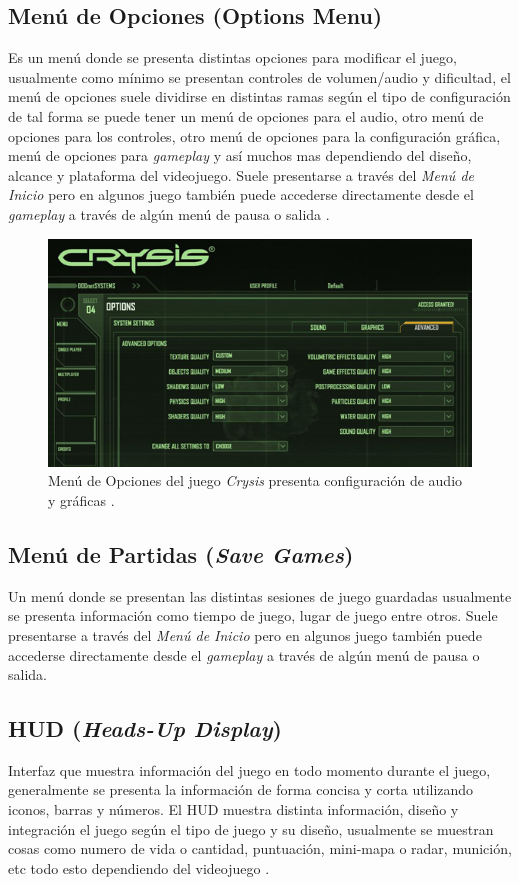 \subsection{Menú de Opciones (Options Menu)}
Es un menú donde se presenta distintas opciones para modificar el juego, usualmente como mínimo se presentan controles de volumen/audio y dificultad, el menú de opciones suele dividirse en distintas ramas según el tipo de configuración de tal forma se puede tener un menú de opciones para el audio, otro menú de opciones para los controles, otro menú de opciones para la configuración gráfica, menú de opciones para \emph{gameplay} y así muchos mas dependiendo del diseño, alcance y plataforma del videojuego. Suele presentarse a través del \emph{Menú de Inicio} pero en algunos juego también puede accederse directamente desde el \emph{gameplay} a través de algún menú de pausa o salida \cite{gb_optionsmenu}.~\\

\begin{figure}[H]
\centering
\includegraphics[width=0.95\linewidth]{media/crysis_opmenu.jpg} 
\caption{Menú de Opciones del juego \emph{Crysis} presenta configuración de audio y gráficas \cite{crysis}.}
\end{figure}

\subsection{Menú de Partidas (\emph{Save Games})}
Un menú donde se presentan las distintas sesiones de juego guardadas usualmente se presenta información como tiempo de juego, lugar de juego entre otros. Suele presentarse a través del \emph{Menú de Inicio} pero en algunos juego también puede accederse directamente desde el \emph{gameplay} a través de algún menú de pausa o salida.

\subsection{HUD (\emph{Heads-Up Display})}
Interfaz que muestra información del juego en todo momento durante el juego, generalmente se presenta la información de forma concisa y corta utilizando iconos, barras y números. El HUD muestra distinta información, diseño y integración el juego según el tipo de juego y su diseño, usualmente se muestran cosas como numero de vida o cantidad, puntuación, mini-mapa o radar, munición, etc todo esto dependiendo del videojuego \cite{huds}.~\\

